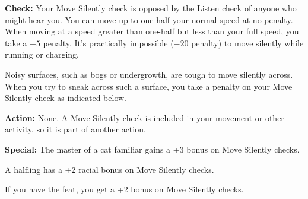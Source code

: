 \textbf{Check:} Your Move Silently check is opposed by the Listen check of anyone who might hear you. You can move up to one-half your normal speed at no penalty. When moving at a speed greater than one-half but less than your full speed, you take a $-5$ penalty. It's practically impossible ($-20$ penalty) to move silently while running or charging.

Noisy surfaces, such as bogs or undergrowth, are tough to move silently across. When you try to sneak across such a surface, you take a penalty on your Move Silently check as indicated below.


\textbf{Action:} None. A Move Silently check is included in your movement or other activity, so it is part of another action.

\textbf{Special:} The master of a cat familiar gains a +3 bonus on Move Silently checks.

A halfling has a +2 racial bonus on Move Silently checks.

If you have the  feat, you get a +2 bonus on Move Silently checks.